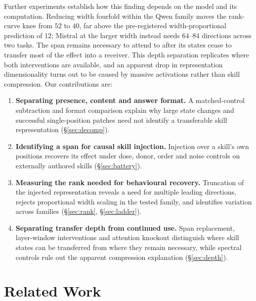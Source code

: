 \documentclass{article}
\begin{document}
Further experiments establish how this finding depends on the model and its
computation. Reducing width fourfold within the Qwen family moves the rank-curve
knee from $52$ to $40$, far above the pre-registered width-proportional prediction
of $12$; Mistral at the larger width instead needs $64$--$84$ directions across
two tasks. The span remains necessary to attend to after its states cease to
transfer most of the effect into a receiver. This depth separation replicates
where both interventions are available, and an apparent drop in representation
dimensionality turns out to be caused by massive activations rather than skill
compression. Our contributions are:
\begin{enumerate}\itemsep0pt\parskip0pt
\item \textbf{Separating presence, content and answer format.} A matched-control
subtraction and format comparison explain why large state changes and successful
single-position patches need not identify a transferable skill representation
(\S\ref{sec:decomp}).
\item \textbf{Identifying a span for causal skill injection.} Injection over a
skill's own positions recovers its effect under dose, donor, order and noise
controls on externally authored skills (\S\ref{sec:battery}).
\item \textbf{Measuring the rank needed for behavioural recovery.} Truncation of
the injected representation reveals a need for multiple leading directions,
rejects proportional width scaling in the tested family, and identifies
variation across families (\S\ref{sec:rank}, \S\ref{sec:ladder}).
\item \textbf{Separating transfer depth from continued use.} Span replacement,
layer-window interventions and attention knockout distinguish where skill states
can be transferred from where they remain necessary, while spectral controls
rule out the apparent compression explanation (\S\ref{sec:depth}).
\end{enumerate}

\section{Related Work}
\label{sec:related}
\end{document}
